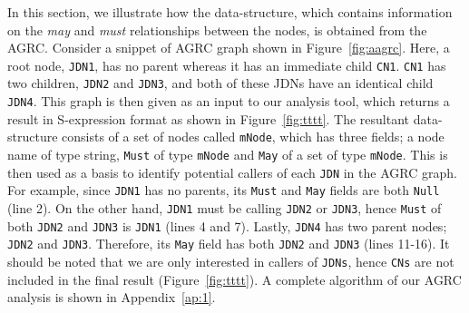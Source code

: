 In this section, we illustrate how the data-structure, which contains
information on the \textit{may} and \textit{must} relationships between
the nodes, is obtained from the AGRC. Consider a snippet of AGRC graph
shown in Figure~\ref{fig:aagrc}. Here, a root node, \texttt{JDN1}, has
no parent whereas it has an immediate child \texttt{CN1}. \texttt{CN1}
has two children, \texttt{JDN2} and \texttt{JDN3}, and both of these
JDNs have an identical child \texttt{JDN4}. This graph is then given as
an input to our analysis tool, which returns a result in S-expression
format as shown in Figure~\ref{fig:tttt}. The resultant data-structure
consists of a set of nodes called \texttt{mNode}, which has three
fields; a node name of type string, \texttt{Must} of type \texttt{mNode}
and \texttt{May} of a set of type \texttt{mNode}. This is then used as a
basis to identify potential callers of each \texttt{JDN} in the AGRC
graph. For example, since \texttt{JDN1} has no parents, its
\texttt{Must} and \texttt{May} fields are both \texttt{Null} (line 2).
On the other hand, \texttt{JDN1} must be calling \texttt{JDN2} or
\texttt{JDN3}, hence \texttt{Must} of both \texttt{JDN2} and
\texttt{JDN3} is \texttt{JDN1} (lines 4 and 7).  Lastly, \texttt{JDN4}
has two parent nodes; \texttt{JDN2} and \texttt{JDN3}. Therefore, its
\texttt{May} field has both \texttt{JDN2} and \texttt{JDN3} (lines
11-16). It should be noted that we are only interested in callers of
\texttt{JDNs}, hence \texttt{CNs} are not included in the final result
(Figure~\ref{fig:tttt}). A complete algorithm of our AGRC analysis is
shown in Appendix~\ref{ap:1}.






